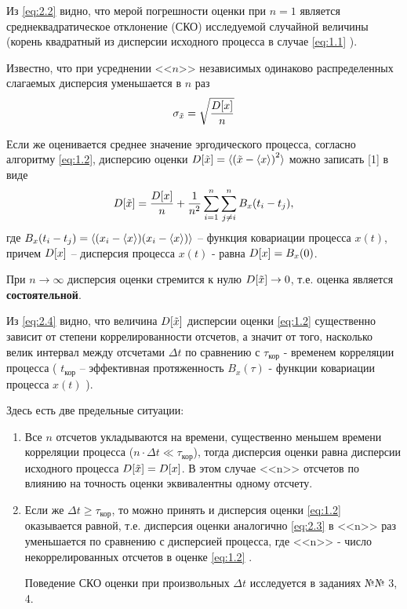 \documentclass[a4paper,14pt]{extarticle}
\newcommand{\D}[1]{D\qty[#1]}
\begin{document}
Из \eqref{eq:2.2} видно, что мерой погрешности оценки при $n=1$ является 
среднеквадратическое отклонение (СКО) исследуемой случайной величины (корень квадратный из дисперсии
исходного процесса в случае \eqref{eq:1.1} ).

Известно, что при усреднении <<$n$>> независимых одинаково распределенных
слагаемых дисперсия уменьшается в $n$ раз
\begin{equation}
    \label{eq:2.3}
    \sigma_{\tilde x} = \sqrt{ \frac{D\qty[x] }{n}}
\end{equation}

Если же оценивается среднее значение эргодического процесса, согласно алгоритму
\eqref{eq:1.2}, дисперсию оценки $D\qty[\tilde x] = \langle \qty( \tilde x - \langle x\rangle )^2 \rangle$
можно записать [1] в виде
\begin{equation}
    \label{eq:2.4}
    D\qty[\tilde x] = \frac{\D{x}}{n} + \frac{1}{n^2} \sum\limits_{i=1}^{n} \sum\limits_{j\neq i}^{n} B_x(t_i - t_j),
\end{equation}
где $B_x(t_i - t_j) = \langle (x_i - \langle x\rangle) (x_i - \langle x\rangle)  \rangle$ -- функция
ковариации процесса  $x(t)$, причем $\D{x}$ -- дисперсия процесса $x(t)$ -
равна $\D{x}=B_x(0)$.

При $n \to \infty$ дисперсия оценки стремится к нулю $\D{\tilde x} \to 0$, т.е.
оценка является \textbf{состоятельной}.

Из \eqref{eq:2.4} видно, что величина $\D{\tilde x}$ дисперсии оценки \eqref{eq:1.2} 
существенно зависит от степени коррелированности отсчетов, а значит от того, насколько
велик интервал между отсчетами $\Delta t$ по сравнению с $\tau_{\text{кор}}$ - временем
корреляции процесса ( $t_{\text{кор}}$ -- эффективная протяженность $B_x(\tau)$ - 
функции ковариации процесса $x(t)$ ).


Здесь есть две предельные ситуации:
\begin{enumerate}
    \item Все $n$ отсчетов укладываются на времени, существенно меньшем времени корреляции
        процесса ($n\cdot \Delta t \ll \tau_{\text{кор}}$), тогда дисперсия оценки равна
        дисперсии исходного процесса $\D{\tilde x}= \D{x}$. В этом случае <<n>> отсчетов
        по влиянию на точность оценки эквивалентны одному отсчету.
    \item  Если же $\Delta t \geq \tau_{\text{кор}}$, то можно принять  и дисперсия оценки \eqref{eq:1.2} 
        оказывается равной, т.е. дисперсия оценки аналогично \eqref{eq:2.3}  в <<n>> раз уменьшается по сравнению с дисперсией процесса, где <<n>> ‑ число некоррелированных отсчетов в оценке \eqref{eq:1.2} .

Поведение СКО оценки при произвольных $\Delta t$ исследуется в заданиях №№ 3, 4.
\end{enumerate}
\end{document}
